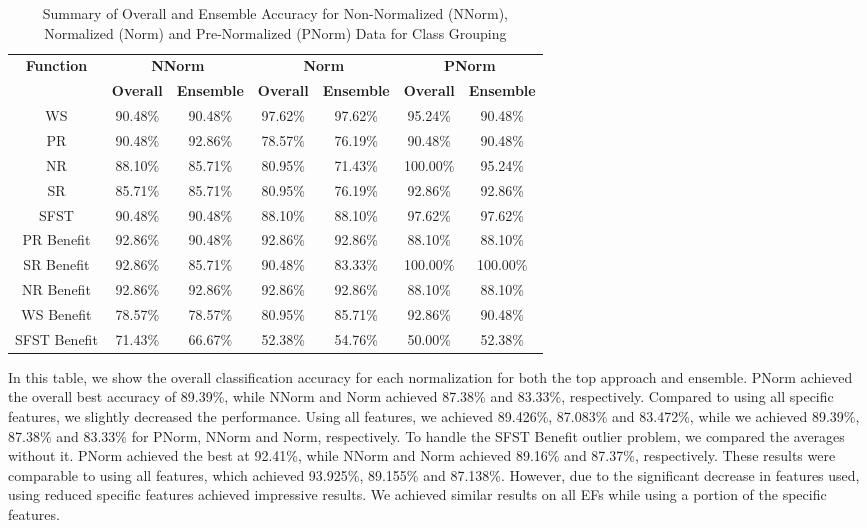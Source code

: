 \documentclass[12pt,letterpaper]{article}
\begin{document}
\begin{table}[H]
\centering
\begin{tabular}{|c||c|c||c|c||c|c|}
\hline
\multirow{2}{*}{\textbf{Function}} & \multicolumn{2}{c||}{\textbf{\ac{NNorm}}} & \multicolumn{2}{c||}{\textbf{Norm}} & \multicolumn{2}{c|}{\textbf{\ac{PNorm}}} \\
\cline{2-7}
 & \textbf{Overall} & \textbf{Ensemble} & \textbf{Overall} & \textbf{Ensemble} & \textbf{Overall} & \textbf{Ensemble} \\
\hline
WS & 90.48\% & 90.48\% & 97.62\% & 97.62\% & 95.24\% & 90.48\% \\
\hline
PR & 90.48\% & 92.86\% & 78.57\% & 76.19\% & 90.48\% & 90.48\% \\
\hline
NR & 88.10\% & 85.71\% & 80.95\% & 71.43\% & 100.00\% & 95.24\% \\
\hline
SR & 85.71\% & 85.71\% & 80.95\% & 76.19\% & 92.86\% & 92.86\% \\
\hline
SFST & 90.48\% & 90.48\% & 88.10\% & 88.10\% & 97.62\% & 97.62\% \\
\hline
PR Benefit & 92.86\% & 90.48\% & 92.86\% & 92.86\% & 88.10\% & 88.10\% \\
\hline
SR Benefit & 92.86\% & 85.71\% & 90.48\% & 83.33\% & 100.00\% & 100.00\% \\
\hline
NR Benefit & 92.86\% & 92.86\% & 92.86\% & 92.86\% & 88.10\% & 88.10\% \\
\hline
WS Benefit & 78.57\% & 78.57\% & 80.95\% & 85.71\% & 92.86\% & 90.48\% \\
\hline
SFST Benefit & 71.43\% & 66.67\% & 52.38\% & 54.76\% & 50.00\% & 52.38\% \\
\hline
\end{tabular}
\caption{Summary of Overall and Ensemble Accuracy for Non-Normalized (\ac{NNorm}), Normalized (Norm) and Pre-Normalized (\ac{PNorm}) Data for Class Grouping}
\label{reg_spec_tab:summary_grouping}
\end{table}

In this table, we show the overall classification accuracy for each normalization for both the top approach and ensemble.
\ac{PNorm} achieved the overall best accuracy of 89.39\%, while \ac{NNorm} and \ac{Norm} achieved 87.38\% and 83.33\%, respectively.
Compared to using all specific features, we slightly decreased the performance.
Using all features, we achieved 89.426\%, 87.083\% and 83.472\%, while we achieved 89.39\%, 87.38\% and 83.33\% for \ac{PNorm}, \ac{NNorm} and Norm, respectively.
To handle the \ac{SFST} Benefit outlier problem, we compared the averages without it.
\ac{PNorm} achieved the best at 92.41\%, while \ac{NNorm} and \ac{Norm} achieved 89.16\% and 87.37\%, respectively.
These results were comparable to using all features, which achieved 93.925\%, 89.155\% and 87.138\%.
However, due to the significant decrease in features used, using reduced specific features achieved impressive results.
We achieved similar results on all \ac{EF}s while using a portion of the specific features.
\end{document}
